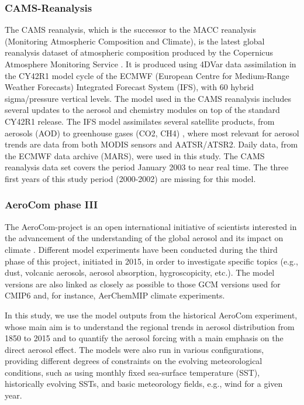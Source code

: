 \documentclass[acp, manuscript]{copernicus}
\begin{document}
\subsubsection{CAMS-Reanalysis}
The CAMS reanalysis, which is the successor to the MACC reanalysis (Monitoring Atmospheric Composition and Climate), is the latest global reanalysis dataset of atmospheric composition produced by the Copernicus Atmosphere Monitoring Service \citep{inness2019cams}. It is produced using 4DVar data assimilation in the CY42R1 model cycle of the ECMWF (European Centre for Medium-Range Weather Forecasts) Integrated Forecast System (IFS), with 60 hybrid sigma/pressure vertical levels. The model used in the CAMS reanalysis includes several updates to the aerosol and chemistry modules on top of the standard CY42R1 release. The IFS model assimilates several satellite products, from aerosols (AOD) to greenhouse gases (CO2, CH4) \citep{inness2019cams}, where most relevant for aerosol trends are data from both MODIS sensors and AATSR/ATSR2. Daily data, from the ECMWF data archive (MARS), were used in this study. The CAMS reanalysis data set covers the period January 2003 to near real time. The three first years of this study period (2000-2002) are missing for this model.

\subsubsection{AeroCom phase III}
The AeroCom-project is an open international initiative of scientists interested in the advancement of the understanding of the global aerosol and its impact on climate \citep{schulz2006radiative}. Different model experiments have been conducted during the third phase of this project, initiated in 2015, in order to investigate specific topics (e.g., dust, volcanic aerosols, aerosol absorption, hygroscopicity, etc.). The model versions are also linked as closely as possible to those GCM versions used for CMIP6 and, for instance, AerChemMIP climate experiments.

In this study, we use the model outputs from the historical AeroCom experiment, whose main aim is to understand the regional trends in aerosol distribution from 1850 to 2015 and to quantify the aerosol forcing with a main emphasis on the direct aerosol effect. The models were also run in various configurations, providing different degrees of constraints on the evolving meteorological conditions, such as using monthly fixed sea-surface temperature (SST), historically evolving SSTs, and basic meteorology fields, e.g., wind for a given year.
\end{document}
